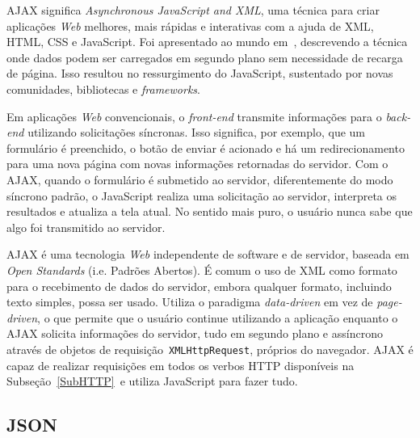 AJAX significa \textit{Asynchronous JavaScript and XML}, uma técnica para criar aplicações \textit{Web} melhores, mais rápidas e interativas com a ajuda de XML, HTML, CSS e JavaScript. Foi apresentado ao mundo em~, descrevendo a técnica onde dados podem ser carregados em segundo plano sem necessidade de recarga de página. Isso resultou no ressurgimento do JavaScript, sustentado por novas comunidades, bibliotecas e \textit{frameworks}.

Em aplicações \textit{Web} convencionais, o \textit{front-end} transmite informações para o \textit{back-end} utilizando solicitações síncronas. Isso significa, por exemplo, que um formulário é preenchido, o botão de enviar é acionado e há um redirecionamento para uma nova página com novas informações retornadas do servidor. Com o AJAX, quando o formulário é submetido ao servidor, diferentemente do modo síncrono padrão, o JavaScript realiza uma solicitação ao servidor, interpreta os resultados e atualiza a tela atual. No sentido mais puro, o usuário nunca sabe que algo foi transmitido ao servidor.

AJAX é uma tecnologia \textit{Web} independente de software e de servidor, baseada em \textit{Open Standards} (i.e. Padrões Abertos). É comum o uso de XML como formato para o recebimento de dados do servidor, embora qualquer formato, incluindo texto simples, possa ser usado. Utiliza o paradigma \textit{data-driven} em vez de \textit{page-driven}, o que permite que o usuário continue utilizando a aplicação enquanto o AJAX solicita informações do servidor, tudo em segundo plano e assíncrono através de objetos de requisição~\texttt{XMLHttpRequest}, próprios do navegador. AJAX é capaz de realizar requisições em todos os verbos HTTP disponíveis na Subseção~\ref{SubHTTP}~e utiliza JavaScript para fazer tudo.
%
%
%
\subsection{JSON}
\label{SubJSON}

